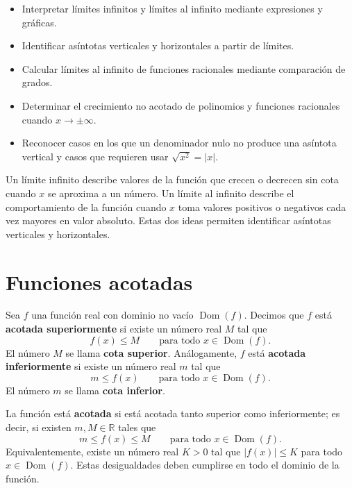 \documentclass[10pt,a5paper]{article}
\begin{document}

\begin{objetivos}
\begin{itemize}
  \item Interpretar límites infinitos y límites al infinito mediante expresiones y gráficas.
  \item Identificar asíntotas verticales y horizontales a partir de límites.
  \item Calcular límites al infinito de funciones racionales mediante comparación de grados.
  \item Determinar el crecimiento no acotado de polinomios y funciones racionales cuando $x\to\pm\infty$.
  \item Reconocer casos en los que un denominador nulo no produce una asíntota vertical y casos que requieren usar $\sqrt{x^2}=|x|$.
\end{itemize}
\end{objetivos}

\begin{resumen}
Un límite infinito describe valores de la función que crecen o decrecen sin cota cuando $x$ se aproxima a un número. Un límite al infinito describe el comportamiento de la función cuando $x$ toma valores positivos o negativos cada vez mayores en valor absoluto. Estas dos ideas permiten identificar asíntotas verticales y horizontales.
\end{resumen}

\section*{Funciones acotadas}

\begin{definicion}
Sea $f$ una función real con dominio no vacío $\operatorname{Dom}(f)$. Decimos que $f$ está \textbf{acotada superiormente} si existe un número real $M$ tal que
\[
  f(x)\leq M\qquad\text{para todo }x\in\operatorname{Dom}(f).
\]
El número $M$ se llama \textbf{cota superior}. Análogamente, $f$ está \textbf{acotada inferiormente} si existe un número real $m$ tal que
\[
  m\leq f(x)\qquad\text{para todo }x\in\operatorname{Dom}(f).
\]
El número $m$ se llama \textbf{cota inferior}.

La función está \textbf{acotada} si está acotada tanto superior como inferiormente; es decir, si existen $m,M\in\mathbb{R}$ tales que
\[
  m\leq f(x)\leq M\qquad\text{para todo }x\in\operatorname{Dom}(f).
\]
Equivalentemente, existe un número real $K>0$ tal que $|f(x)|\leq K$ para todo $x\in\operatorname{Dom}(f)$. Estas desigualdades deben cumplirse en todo el dominio de la función.
\end{definicion}
\end{document}
